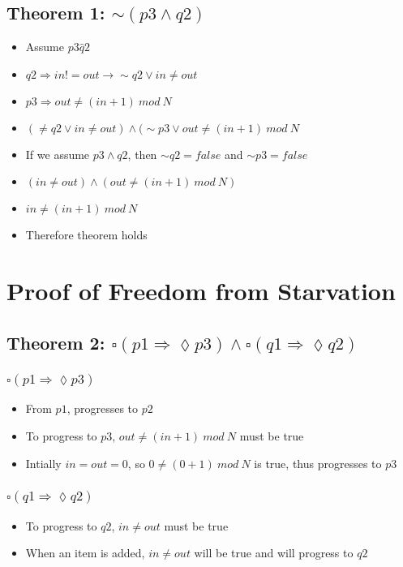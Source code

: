 \documentclass[12pt,a4paper]{article}
\begin{document}
\subsection*{\textbf{Theorem 1}: $\sim(p3 \wedge q2)$}
\begin{itemize}
    \item Assume $p3 \hat q2$
    \item $q2 \Longrightarrow in != out \longrightarrow \sim q2 \vee in \neq out$
    \item $p3 \Longrightarrow out \neq (in + 1)\ mod\ N$
    \item $(\neq q2 \vee in \neq out) \wedge (\sim p3 \vee out \neq (in + 1)\ mod\ N$
    \item If we assume $p3 \wedge q2$, then $\sim q2 = false$ and $\sim p3 = false$
    \item $(in \neq out) \wedge (out \neq (in + 1)\ mod\ N)$
    \item $in \neq (in + 1)\ mod\ N$
    \item Therefore theorem holds
\end{itemize}

\section{Proof of Freedom from Starvation}

\subsection*{\textbf{Theorem 2}: $\square(p1 \Longrightarrow \lozenge p3) \wedge \square(q1 \Longrightarrow \lozenge q2)$}

\subsubsection*{$\square (p1 \Longrightarrow \lozenge p3)$}
\begin{itemize}
    \item From $p1$, progresses to $p2$
    \item To progress to $p3$, $out \neq (in+1)\ mod\ N$ must be true
    \item Intially $in = out = 0$, so $0 \neq (0+1)\ mod\ N$ is true, thus progresses to $p3$
\end{itemize}

\subsubsection*{$\square (q1 \Longrightarrow \lozenge q2)$}
\begin{itemize}
    \item To progress to $q2$, $in \neq out$ must be true
    \item When an item is added, $in \neq out$ will be true and will progress to $q2$

\end{itemize}
\end{document}
